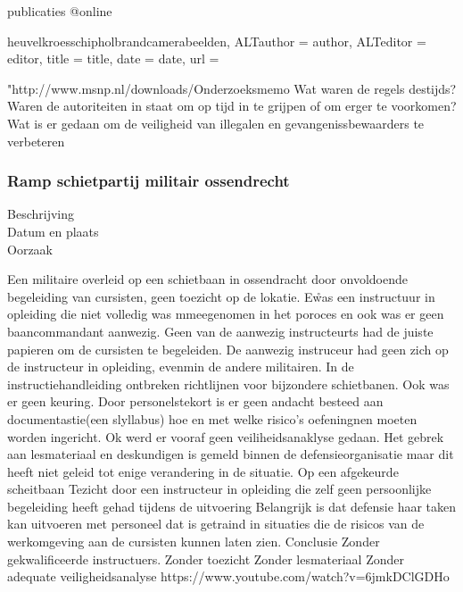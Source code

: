 {{{{publicaties
@online{heuvelkroesschipholbrandcamerabeelden,	ALTauthor = {author},	ALTeditor = {editor},	title = {title},	date = {date},	url = {"http://www.msnp.nl/downloads/Onderzoeksmemo%
Wat waren de regels destijds?
Waren de autoriteiten in staat om op tijd in te grijpen of om erger te voorkomen?
Wat is er gedaan om de veiligheid van illegalen en gevangenissbewaarders te verbeteren

\subsubsection{Ramp schietpartij militair ossendrecht }

\begin{description}
\item[Beschrijving]
\item[Datum en plaats] 
\item[Oorzaak]
\end{description}
Een militaire overleid op een schietbaan in ossendracht door onvoldoende begeleiding van cursisten, geen toezicht op de lokatie. E\r was een instructuur in opleiding die niet volledig was mmeegenomen in het poroces en ook was er geen baancommandant aanwezig. Geen van de aanwezig instructeurts had de juiste papieren om de cursisten te begeleiden. De aanwezig instruceur had geen zich op de instructeur in opleiding, evenmin de andere militairen. In de instructiehandleiding ontbreken richtlijnen voor bijzondere schietbanen. Ook was er geen keuring. Door personelstekort is er geen andacht besteed aan documentastie(een slyllabus) hoe en met welke risico’s oefeningnen moeten worden ingericht. Ok werd er vooraf geen veiliheidsanaklyse gedaan. Het gebrek aan lesmateriaal en deskundigen is gemeld binnen de defensieorganisatie maar dit heeft niet geleid tot enige verandering in de situatie.
Op een afgekeurde scheitbaan
Tezicht door een instructeur in opleiding die zelf geen persoonlijke begeleiding heeft gehad tijdens de uitvoering
Belangrijk is dat defensie haar taken kan uitvoeren met personeel dat is getraind in situaties die de risicos van de werkomgeving aan de cursisten kunnen laten zien.
Conclusie
Zonder gekwalificeerde instructuers.
Zonder toezicht
Zonder lesmateriaal
Zonder adequate veiligheidsanalyse
https://www.youtube.com/watch?v=6jmkDClGDHo 
\cite{oVVSchietongevalOssendrecht}



}}}}}}
